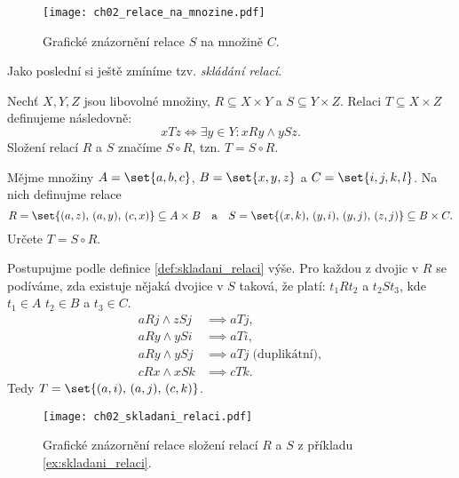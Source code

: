\begin{figure}[h]
    \centering
    \texttt{[image: ch02\_relace\_na\_mnozine.pdf]}
    \caption{Grafické znázornění relace $S$ na množině $C$.}
    \label{fig:relace_mezi_mnozinami}
\end{figure}
Jako poslední si ještě zmíníme tzv. \emph{skládání relací}.
\begin{definition}\label{def:skladani_relaci}
    Nechť $X,Y,Z$ jsou libovolné množiny, $R\subseteq X\times Y$ a $S\subseteq Y\times Z$. Relaci $T\subseteq X\times Z$ definujeme následovně:
    \begin{equation*}
        xTz \iff \exists y\in Y : xRy \land ySz.
    \end{equation*}
    Složení relací $R$ a $S$ značíme $S\circ R$, tzn. $T=S\circ R$.
\end{definition}
\begin{example}\label{ex:skladani_relaci}
    Mějme množiny $A=\set{a,b,c}$, $B=\set{x,y,z}$ a $C=\set{i,j,k,l}$. Na nich definujme relace
    \begin{equation*}
        R=\set{(a,z),\,(a,y),\,(c,x)}\subseteq A\times B\quad\text{a}\quad S=\set{(x,k),\,(y,i),\,(y,j),\,(z,j)}\subseteq B\times C.
    \end{equation*}
    Určete $T=S\circ R$.
\end{example}
\begin{solution}
    Postupujme podle definice \ref{def:skladani_relaci} výše. Pro každou z dvojic v $R$ se podíváme, zda existuje nějaká dvojice v $S$ taková, že platí: $t_1Rt_2$ a $t_2St_3$, kde $t_1\in A$ $t_2\in B$ a $t_3\in C$.
    \begin{align*}
        aRj \land zSj &\implies aTj,\\
        aRy \land ySi &\implies aTi,\\
        aRy \land ySj &\implies aTj\;\text{(duplikátní)},\\
        cRx \land xSk &\implies cTk.
    \end{align*}
    Tedy $T=\set{(a,i),\,(a,j),\,(c,k)}$.
\end{solution}
\begin{figure}[h]
    \centering
    \texttt{[image: ch02\_skladani\_relaci.pdf]}
    \caption{Grafické znázornění relace složení relací $R$ a $S$ z příkladu \ref{ex:skladani_relaci}.}
    \label{fig:relace_mezi_mnozinami}
\end{figure}

